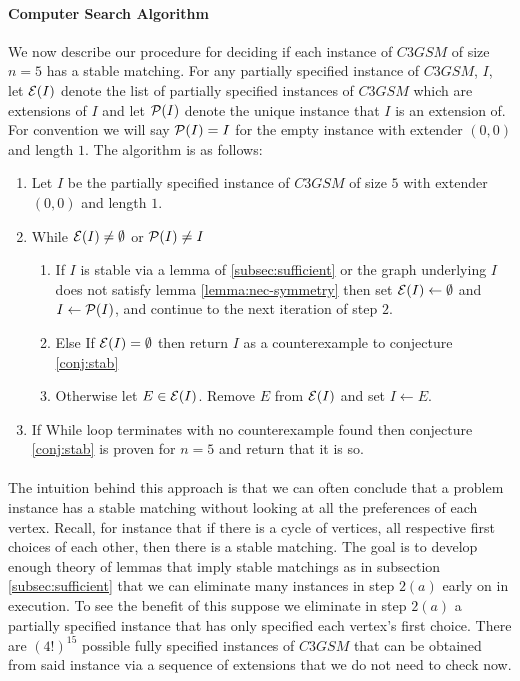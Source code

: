 \paragraph{Computer Search Algorithm}
We now describe our procedure for deciding if each instance of $C3GSM$ of size $n=5$ has a stable matching. For any partially specified instance of $C3GSM$, $I$, let $\mathcal{E}(I)$ denote the list of partially specified instances of $C3GSM$ which are extensions of $I$ and let $\mathcal{P}(I)$ denote the unique instance that $I$ is an extension of. For convention we will say $\mathcal{P}(I) = I$ for the empty instance with extender $(0,0)$ and length $1$. The algorithm is as follows:
\begin{enumerate}
\item Let $I$ be the partially specified instance of $C3GSM$ of size $5$ with extender $(0,0)$ and length $1$.
\item While $\mathcal{E}(I) \neq \emptyset$ or $\mathcal{P}(I) \neq I$
	\begin{enumerate}
	\item If $I$ is stable via a lemma of \ref{subsec:sufficient} or the graph underlying $I$ does not satisfy lemma \ref{lemma:nec-symmetry} then set $\mathcal{E}(I) \leftarrow \emptyset$ and $I \leftarrow \mathcal{P}(I)$, and continue to the next iteration of step $2$.
	\item Else If $\mathcal{E}(I) = \emptyset$ then return $I$ as a counterexample to conjecture \ref{conj:stab}
	\item Otherwise let $E \in \mathcal{E}(I)$. Remove $E$ from $\mathcal{E}(I)$ and set $I \leftarrow E$. 
	\end{enumerate}
\item If While loop terminates with no counterexample found then conjecture \ref{conj:stab} is proven for $n=5$ and return that it is so.
\end{enumerate}
\paragraph{}
The intuition behind this approach is that we can often conclude that a problem instance has a stable matching without looking at all the preferences of each vertex. Recall, for instance that if there is a cycle of vertices, all respective first choices of each other, then there is a stable matching. The goal is to develop enough theory of lemmas that imply stable matchings as in subsection \ref{subsec:sufficient} that we can eliminate many instances in step $2(a)$ early on in execution. To see the benefit of this suppose we eliminate in step $2(a)$ a partially specified instance that has only specified each vertex's first choice. There are $(4!)^{15}$ possible fully specified instances of $C3GSM$ that can be obtained from said instance via a sequence of extensions that we do not need to check now.

